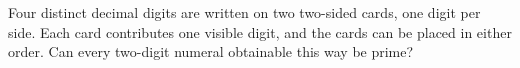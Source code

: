 Four distinct decimal digits are written on two two-sided cards, one digit per side. Each card contributes one visible digit, and the cards can be placed in either order. Can every two-digit numeral obtainable this way be prime?
